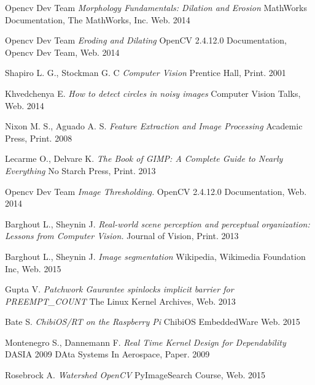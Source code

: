 \documentclass[12pt,twoside,a4paper]{article}
\begin{document}
\begin{thebibliography}{1}
Opencv Dev Team
\textit{Morphology Fundamentals: Dilation and Erosion} MathWorks Documentation, The MathWorks, Inc. Web. 2014

Opencv Dev Team
\textit{Eroding and Dilating} OpenCV 2.4.12.0 Documentation, Opencv Dev Team, Web. 2014

Shapiro L. G., Stockman G. C
\textit{Computer Vision} Prentice Hall, Print. 2001

Khvedchenya E.
\textit{How to detect circles in noisy images} Computer Vision Talks, Web. 2014

Nixon M. S., Aguado A. S.
\textit{Feature Extraction and Image Processing} Academic Press, Print. 2008

Lecarme  O., Delvare K.
\textit{The Book of GIMP: A Complete Guide to Nearly Everything} No Starch Press, Print. 2013

Opencv Dev Team
\textit{Image Thresholding.} OpenCV 2.4.12.0 Documentation, Web. 2014

Barghout L., Sheynin J.
\textit{Real-world scene perception and perceptual organization: Lessons from Computer Vision.} Journal of Vision, Print. 2013

Barghout L., Sheynin J.
\textit{Image segmentation} Wikipedia, Wikimedia Foundation Inc, Web. 2015

Gupta V.
\textit{Patchwork Gaurantee spinlocks implicit barrier for PREEMPT\_COUNT} The Linux Kernel Archives, Web. 2013

Bate S.
\textit{ChibiOS/RT on the Raspberry Pi} ChibiOS EmbeddedWare Web. 2015

Montenegro S., Dannemann F. 
\textit{Real Time Kernel Design for Dependability} DASIA 2009 DAta Systems In Aerospace, Paper. 2009

Rosebrock A.
\textit{Watershed OpenCV} PyImageSearch Course, Web. 2015

\end{thebibliography}
\end{document}
